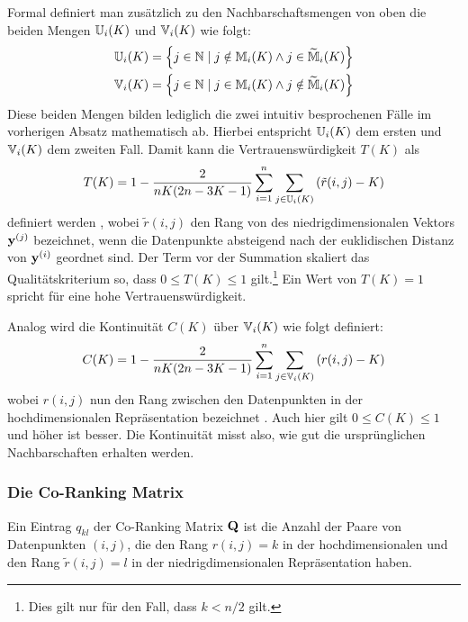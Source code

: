 Formal definiert man zusätzlich zu den Nachbarschaftsmengen von oben die beiden Mengen
$\mathbb{U}_i(K)$ und $\mathbb{V}_i(K)$ wie folgt:
\begin{gather}
	\mathbb{U}_i(K) =  \left\{ j \in \mathbb{N} \mid j \notin \mathbb{M}_i(K) \land j \in \widetilde{\mathbb{M}}_i(K) \right\} \\
	\mathbb{V}_i(K) =  \left\{ j \in \mathbb{N} \mid j \in \mathbb{M}_i(K) \land j \notin \widetilde{\mathbb{M}}_i(K) \right\}
\end{gather}
Diese beiden Mengen bilden lediglich die zwei intuitiv besprochenen Fälle im vorherigen Absatz mathematisch ab. Hierbei entspricht $\mathbb{U}_i(K)$ dem ersten und $\mathbb{V}_i(K)$ dem zweiten Fall.
Damit kann die Vertrauenswürdigkeit $T(K)$ als
\begin{equation}
	T(K) = 1 - \frac{2}{nK(2n - 3K - 1)} \sum_{i = 1}^{n}\sum_{j \in \mathbb{U}_i(K) } \left( \tilde{r}(i, j) - K \right)
\end{equation}
definiert werden \parencite[487]{Venna.2001}, wobei $\tilde{r}(i, j)$ den Rang von des niedrigdimensionalen Vektors
$\mathbf{y}^{(j)}$ bezeichnet, wenn die Datenpunkte absteigend nach der euklidischen Distanz von
$\mathbf{y}^{(i)}$ geordnet sind. Der Term vor der Summation skaliert das Qualitätskriterium so, dass
$0 \leq T(K) \leq 1$ gilt.\footnote{Dies gilt nur für den Fall, dass $k < n/2$ gilt.} Ein Wert von
$T(K) = 1­$ spricht für eine hohe Vertrauenswürdigkeit.

Analog wird die Kontinuität $C(K)$ über $\mathbb{V}_i(K)$ wie folgt definiert:
\begin{equation}
	C(K) = 1 - \frac{2}{nK(2n - 3K - 1)} \sum_{i = 1}^{n}\sum_{j \in \mathbb{V}_i(K) } \left( r(i, j) - K \right)
\end{equation}
wobei $r(i, j)$ nun den Rang zwischen den Datenpunkten in der hochdimensionalen Repräsentation bezeichnet \parencite[487]{Venna.2001}. Auch hier gilt $0 \leq C(K) \leq 1$ und höher ist besser. Die Kontinuität
misst also, wie gut die ursprünglichen Nachbarschaften erhalten werden. 

\subsubsection{Die Co-Ranking Matrix}
Ein Eintrag $q_{kl}$ der Co-Ranking Matrix $\mathbf{Q}$ ist die Anzahl der Paare von Datenpunkten $(i,
	j)$, die den Rang $r(i, j) = k$ in der hochdimensionalen und den Rang $\tilde{r}(i, j) = l$ in der
niedrigdimensionalen Repräsentation haben.

